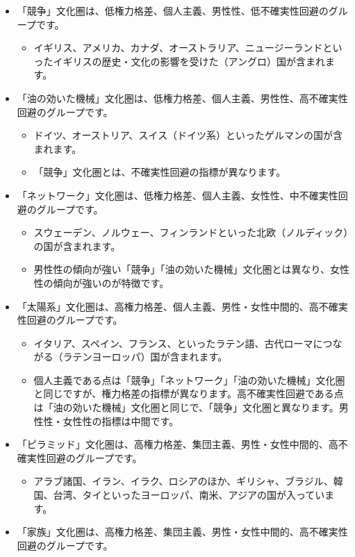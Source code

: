 \documentclass[
]{book}
\providecommand{\tightlist}{%
  \setlength{\itemsep}{0pt}\setlength{\parskip}{0pt}}
\begin{document}
\begin{itemize}
\item
  「競争」文化圏は、低権力格差、個人主義、男性性、低不確実性回避のグループです。

  \begin{itemize}
  \tightlist
  \item
    イギリス、アメリカ、カナダ、オーストラリア、ニュージーランドといったイギリスの歴史・文化の影響を受けた（アングロ）国が含まれます。
    \\
  \end{itemize}
\item
  「油の効いた機械」文化圏は、低権力格差、個人主義、男性性、高不確実性回避のグループです。

  \begin{itemize}
  \item
    ドイツ、オーストリア、スイス（ドイツ系）といったゲルマンの国が含まれます。
  \item
    「競争」文化圏とは、不確実性回避の指標が異なります。
  \end{itemize}
\item
  「ネットワーク」文化圏は、低権力格差、個人主義、女性性、中不確実性回避のグループです。

  \begin{itemize}
  \item
    スウェーデン、ノルウェー、フィンランドといった北欧（ノルディック）の国が含まれます。
  \item
    男性性の傾向が強い「競争」「油の効いた機械」文化圏とは異なり、女性性の傾向が強いのが特徴です。
  \end{itemize}
\item
  「太陽系」文化圏は、高権力格差、個人主義、男性・女性中間的、高不確実性回避のグループです。

  \begin{itemize}
  \item
    イタリア、スペイン、フランス、といったラテン語、古代ローマにつながる（ラテンヨーロッパ）国が含まれます。
  \item
    個人主義である点は「競争」「ネットワーク」「油の効いた機械」文化圏と同じですが、権力格差の指標が異なります。高不確実性回避である点は「油の効いた機械」文化圏と同じで、「競争」文化圏と異なります。男性性・女性性の指標は中間です。
  \end{itemize}
\item
  「ピラミッド」文化圏は、高権力格差、集団主義、男性・女性中間的、高不確実性回避のグループです。

  \begin{itemize}
  \tightlist
  \item
    アラブ諸国、イラン、イラク、ロシアのほか、ギリシャ、ブラジル、韓国、台湾、タイといったヨーロッパ、南米、アジアの国が入っています。
    \\
  \end{itemize}
\item
  「家族」文化圏は、高権力格差、集団主義、男性・女性中間的、高不確実性回避のグループです。


\end{itemize}
\end{document}
